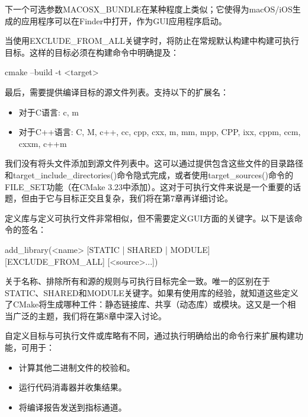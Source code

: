 下一个可选参数MACOSX\_BUNDLE在某种程度上类似；它使得为macOS/iOS生成的应用程序可以在Finder中打开，作为GUI应用程序启动。

当使用EXCLUDE\_FROM\_ALL关键字时，将防止在常规默认构建中构建可执行目标。这样的目标必须在构建命令中明确提及：

\begin{shell}
cmake --build -t <target>
\end{shell}

最后，需要提供编译目标的源文件列表。支持以下的扩展名：

\begin{itemize}
\item
对于C语言: c, m

\item
对于C++语言: C, M, c++, cc, cpp, cxx, m, mm, mpp, CPP, ixx, cppm, ccm, cxxm, c++m
\end{itemize}

我们没有将头文件添加到源文件列表中。这可以通过提供包含这些文件的目录路径和target\_include\_directories()命令隐式完成，或者使用target\_sources()命令的FILE\_SET功能（在CMake 3.23中添加）。这对于可执行文件来说是一个重要的话题，但由于它与目标正交且复杂，我们将在第7章再详细讨论。


定义库与定义可执行文件非常相似，但不需要定义GUI方面的关键字。以下是该命令的签名：

\begin{shell}
add_library(<name> [STATIC | SHARED | MODULE]
            [EXCLUDE_FROM_ALL]
            [<source>...])
\end{shell}

关于名称、排除所有和源的规则与可执行目标完全一致。唯一的区别在于STATIC、SHARED和MODULE关键字。如果有使用库的经验，就知道这些定义了CMake将生成哪种工件：静态链接库、共享（动态库）或模块。这又是一个相当广泛的主题，我们将在第8章中深入讨论。


自定义目标与可执行文件或库略有不同，通过执行明确给出的命令行来扩展构建功能，可用于：

\begin{itemize}
\item
计算其他二进制文件的校验和。

\item
运行代码消毒器并收集结果。

\item
将编译报告发送到指标通道。
\end{itemize}

